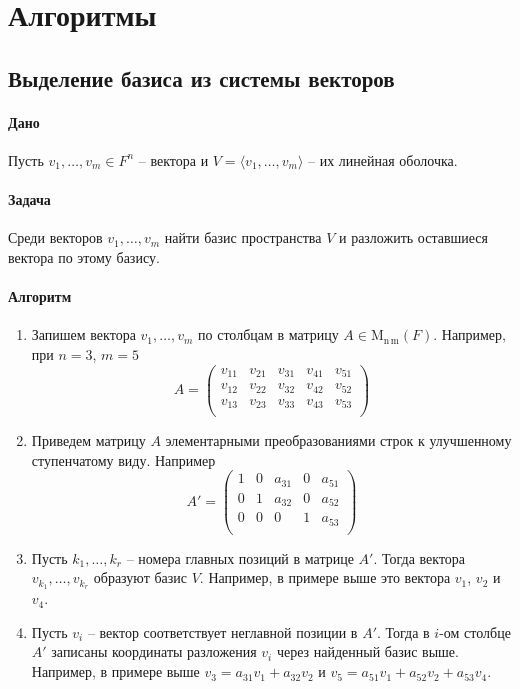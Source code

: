 \documentclass{article}
\newcommand{\MatrixDim}[3]{\operatorname{\mathrm{M}_{#2\,#3}}(#1)}
\begin{document}
\section*{Алгоритмы}

\subsection{Выделение базиса из системы векторов}

\paragraph{Дано}

Пусть $v_1,\ldots,v_m\in F^n$ -- вектора и $V = \langle v_1,\ldots,v_m\rangle$ -- их линейная оболочка.

\paragraph{Задача}

Среди векторов $v_1,\ldots,v_m$ найти базис пространства $V$ и разложить оставшиеся вектора по этому базису.

\paragraph{Алгоритм}

\begin{enumerate}
\item Запишем вектора $v_1,\ldots,v_m$ по столбцам в матрицу $A \in \MatrixDim{F}{n}{m}$.
Например, при $n = 3$, $m = 5$
\[
A = 
\begin{pmatrix}
{v_{11}}&{v_{21}}&{v_{31}}&{v_{41}}&{v_{51}}\\
{v_{12}}&{v_{22}}&{v_{32}}&{v_{42}}&{v_{52}}\\
{v_{13}}&{v_{23}}&{v_{33}}&{v_{43}}&{v_{53}}\\
\end{pmatrix}
\]

\item Приведем матрицу $A$ элементарными преобразованиями строк к улучшенному ступенчатому виду.
Например
\[
A' = 
\begin{pmatrix}
{1}&{0}&{a_{31}}&{0}&{a_{51}}\\
{0}&{1}&{a_{32}}&{0}&{a_{52}}\\
{0}&{0}&{0}&{1}&{a_{53}}\\
\end{pmatrix}
\]

\item Пусть $k_1,\ldots,k_r$ -- номера главных позиций в матрице $A'$.
Тогда вектора $v_{k_1},\ldots,v_{k_r}$ образуют базис $V$.
Например, в примере выше это вектора $v_1$, $v_2$ и $v_4$.

\item Пусть $v_i$ -- вектор соответствует неглавной позиции в $A'$.
Тогда в $i$-ом столбце $A'$ записаны координаты разложения $v_i$ через найденный базис выше.
Например, в примере выше $v_3 = a_{31}v_1 + a_{32}v_2$ и $v_5 = a_{51}v_1 + a_{52}v_2 + a_{53}v_4$.
\end{enumerate}
\end{document}
